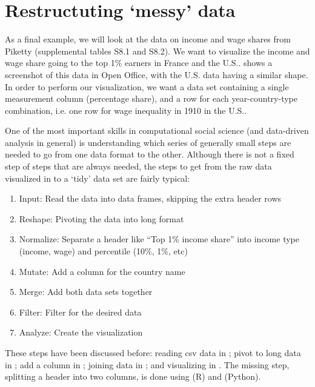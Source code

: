 \section{Restructuting `messy' data}

As a final example, we will look at the data on income and wage shares from Piketty (supplemental tables S8.1 and S8.2).
We want to visualize the income and wage share going to the top 1\% earners in France and the U.S..
 shows a screenshot of this data in Open Office, with the U.S. data having a similar shape.
In order to perform our visualization, we want a data set containing a single measurement column (percentage share),
and a row for each year-country-type combination, i.e. one row for wage inequality in 1910 in the U.S..

\begin{figure}

\end{figure}

One of the most important skills in computational social science (and data-driven analysis in general) is
understanding which series of generally small steps are needed to go from one data format to the other.
Although there is not a fixed step of steps that are always needed, the steps to get from the raw data visualized in  to a `tidy' data set are fairly typical:

\begin{enumerate}
  \item Input: Read the data into data frames, skipping the extra header rows
  \item Reshape: Pivoting the data into long format
  \item Normalize: Separate a header like ``Top 1\% income share'' into income type (income, wage) and percentile (10\%, 1\%, etc)
  \item Mutate: Add a column for the country name
  \item Merge: Add both data sets together
  \item Filter: Filter for the desired data
  \item Analyze: Create the visualization
\end{enumerate}

These steps have been discussed before: reading csv data in ; pivot to long data in ;
add a column in ; joining data in ; and visualizing in .
The missing step, splitting a header into two columns, is done using  (R) and  (Python). 

